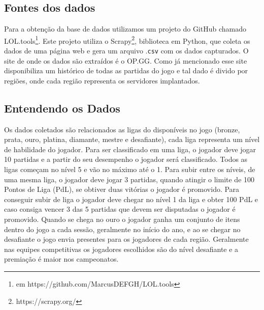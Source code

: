 \documentclass[a4paper]{article}
\begin{document}
\subsection{Fontes dos dados}
\label{sec:fontedados}
Para a obtenção da base de dados utilizamos um projeto do GitHub chamado LOL.tools\footnote{em https://github.com/MarcusDEFGH/LOL.tools}. Este projeto utiliza o Scrapy\footnote{https://scrapy.org/}, biblioteca em Python, que coleta os dados de uma página web e gera um arquivo .\texttt{csv} com os dados capturados. O site de onde os dados são extraídos é o OP.GG. Como já mencionado esse site disponibiliza um histórico de todas as partidas do jogo e tal dado é divido por regiões, onde cada região representa os servidores implantados.

\subsection{Entendendo os Dados}
\label{sec:entendendo}
Os dados coletados são relacionados as ligas do disponíveis no jogo (bronze, prata, ouro, platina, diamante, mestre e desafiante), cada liga representa um nível de habilidade do jogador. Para ser classificado em uma liga, o jogador deve jogar 10 partidas e a partir do seu desempenho o jogador será classificado. Todos as ligas começam no nível 5 e vão no máximo até o 1. Para subir entre os níveis, de uma mesma liga, o jogador deve jogar 3 partidas, quando atingir o limite de 100 Pontos de Liga (PdL), se obtiver duas vitórias o jogador é promovido. Para conseguir subir de liga o jogador deve chegar no nível 1 da liga e obter 100 PdL e caso consiga vencer 3 das 5 partidas que devem ser disputadas o jogador é promovido. Quando se chega no ouro o jogador ganha um conjunto de itens dentro do jogo a cada sessão, geralmente no início do ano, e ao se chegar no desafiante o jogo envia presentes para os jogadores de cada região. Geralmente nas equipes competitivas os jogadores escolhidos são do nível desafiante e a premiação é maior nos campeonatos. 
\end{document}
